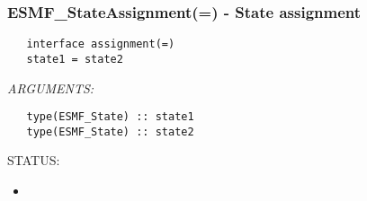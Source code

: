  
\setlength{\oldparskip}{\parskip}
\setlength{\parskip}{1.5ex}
\setlength{\oldparindent}{\parindent}
\setlength{\parindent}{0pt}
\setlength{\oldbaselineskip}{\baselineskip}
\setlength{\baselineskip}{11pt}
 
\def\bv{\begin{verbatim}}
\def\ev{\end{verbatim}}
\def\be{\begin{equation}}
\def\ee{\end{equation}}
\def\bea{\begin{eqnarray}}
\def\eea{\end{eqnarray}}
\def\bi{\begin{itemize}}
\def\ei{\end{itemize}}
\def\bn{\begin{enumerate}}
\def\en{\end{enumerate}}
\def\bd{\begin{description}}
\def\ed{\end{description}}
\def\({\left (}
\def\){\right )}
\def\[{\left [}
\def\]{\right ]}
\def\<{\left  \langle}
\def\>{\right \rangle}
\def\cI{{\cal I}}
\def\diag{\mathop{\rm diag}}
\def\tr{\mathop{\rm tr}}


 
\subsubsection [ESMF\_StateAssignment(=)] {ESMF\_StateAssignment(=) - State assignment}


  
\begin{verbatim}   interface assignment(=)
   state1 = state2\end{verbatim}{\em ARGUMENTS:}
\begin{verbatim}   type(ESMF_State) :: state1
   type(ESMF_State) :: state2\end{verbatim}
{\sf STATUS:}
   \begin{itemize}
   \item{}
   \end{itemize}
  
